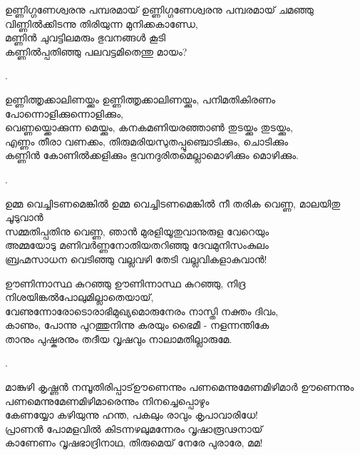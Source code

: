 \begin{enumerate}
\begin{slokam}{\VVt}{\VNM}{ഉണ്ണിഗ്ഗണേശ്വരനു പമ്പരമായ്}
 ഉണ്ണിഗ്ഗണേശ്വരനു പമ്പരമായ് ചമഞ്ഞു \\
വിണ്ണില്‍ക്കിടന്നു തിരിയുന്ന മുനിക്കകാണ്ഡേ, \\
മണ്ണിന്‍ ചുവട്ടിലമരും ഭുവനങ്ങള്‍ കൂടി \\
കണ്ണില്‍പ്പതിഞ്ഞു പലവട്ടമിതെന്തു മായം?
\end{slokam}


.


\begin{slokam}{\VSr}{\KothJ}{ഉണ്ണിത്തൃക്കാലിണയ്ക്കും}
ഉണ്ണിത്തൃക്കാലിണയ്ക്കും, പനിമതികിരണം പോന്നൊളിക്കുന്നൊളിക്കും,\\
വെണ്ണയ്ക്കൊക്കുന്ന മെയ്ക്കും, കനകമണിയരഞ്ഞാൺ തുടയ്ക്കും തുടയ്ക്കും,\\
എണ്ണം തീരാ വണക്കം, തിരുമരിയസുതപ്പൂഞ്ചൊടിക്കും, ചൊടിക്കും\\
കണ്ണിൻ കോണിൽക്കളിക്കും ഭുവനദുരിതമെല്ലാമൊഴിക്കും മൊഴിക്കും.
\end{slokam}


.

\begin{slokam}{\VKm}{\PCM}{ഉമ്മ വെച്ചിടണമെങ്കിൽ}
ഉമ്മ വെച്ചിടണമെങ്കിൽ നീ തരിക വെണ്ണ, മാലയിതു ചൂടുവാൻ\\
സമ്മതിപ്പതിനു വെണ്ണ, ഞാൻ മുരളിയൂതുവാനുരുള വേറെയും\\
അമ്മയോടു മണിവർണ്ണനോതിയതറിഞ്ഞു ദേവമുനിസംകുലം\\
ബ്രഹ്മസാധന വെടിഞ്ഞു വല്ലവഴി തേടി വല്ലവികളാകുവാൻ!
\end{slokam}


\begin{slokam}{\VSv}{\UV}{ഊണിന്നാസ്ഥ കുറഞ്ഞു}
ഊണിന്നാസ്ഥ കുറഞ്ഞു, നിദ്ര നിശയിങ്കൽപോലുമില്ലാതെയായ്‌,\\
വേണുന്നോരോടൊരാഭിമുഖ്യമൊരുനേരം നാസ്തി നക്തം ദിവം,\\
കാണും, പോന്നു പുറത്തുനിന്നു കരയും ഭൈമീ - നളന്നന്തികേ\\
താനും പുഷ്കരനും തദീയ വൃഷവും നാലാമതില്ലാരുമേ. 
\end{slokam}


.

\begin{slokam}{\VSv}{മാങ്കുഴി കൃഷ്ണൻ നമ്പൂതിരിപ്പാട്}{ഊണെന്നും പണമെന്നുമേണമിഴിമാർ}
ഊണെന്നും പണമെന്നുമേണമിഴിമാരെന്നും നിനച്ചെപ്പൊഴും\\
കേണയ്യോ കഴിയുന്നു ഹന്ത, പകലും രാവും കൃപാവാരിധേ! \\
പ്രാണൻ പോമളവിൽ കിടന്നഴലുമന്നേരം വൃഷാരൂഢനായ്\\
കാണേണം വൃഷഭാദ്രിനാഥ,   തിരുമെയ് നേരേ പുരാരേ, മമ!
\end{slokam}


\end{enumerate}

